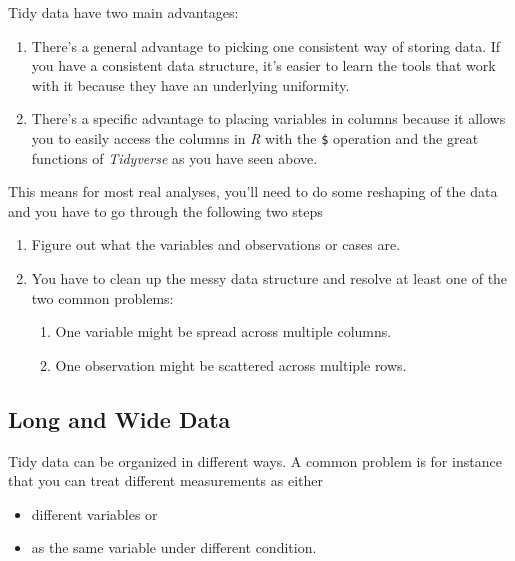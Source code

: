\documentclass[
]{scrartcl}
\providecommand{\tightlist}{%
  \setlength{\itemsep}{0pt}\setlength{\parskip}{0pt}}
\begin{document}
Tidy data have two main advantages:

\begin{enumerate}
\def\labelenumi{\arabic{enumi}.}
\tightlist
\item
  There's a general advantage to picking one consistent way of storing data. If you have a consistent data structure, it's easier to learn the tools that work with it because they have an underlying uniformity.
\item
  There's a specific advantage to placing variables in columns because it allows you to easily access the columns in \emph{R} with the \texttt{\$} operation and the great functions of \emph{Tidyverse} as you have seen above.
\end{enumerate}

This means for most real analyses, you'll need to do some reshaping of the data and you have to go through the following two steps

\begin{enumerate}
\def\labelenumi{\arabic{enumi}.}
\tightlist
\item
  Figure out what the variables and observations or cases are.
\item
  You have to clean up the messy data structure and resolve at least one of the two common problems:

  \begin{enumerate}
  \def\labelenumii{\alph{enumii}.}
  \tightlist
  \item
    One variable might be spread across multiple columns.
  \item
    One observation might be scattered across multiple rows.
  \end{enumerate}
\end{enumerate}

\subsection{Long and Wide Data}\label{long-and-wide-data}

Tidy data can be organized in different ways. A common problem is for instance that you can treat different measurements as either

\begin{itemize}
\tightlist
\item
  different variables or
\item
  as the same variable under different condition.
\end{itemize}
\end{document}
